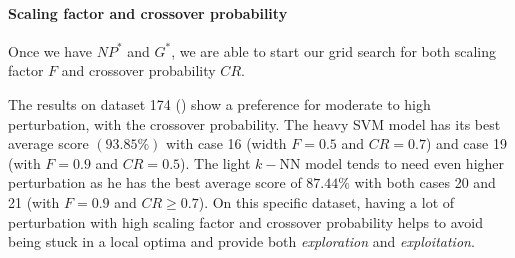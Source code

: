 \documentclass[12pt, openany]{article}
\begin{document}
\paragraph{Scaling factor and crossover probability} Once we have $NP^*$ and $G^*$, we are able to start our grid search for both scaling factor $F$ and crossover probability $CR$.

The results on dataset 174 () show a preference for moderate to high perturbation, with the crossover probability. The heavy SVM model has its best average score $(93.85\%)$ with case 16 (width $F=0.5$ and $CR=0.7$) and case 19 (with $F=0.9$ and $CR=0.5$). The light $k-$NN model tends to need even higher perturbation as he has the best average score of $87.44\%$ with both cases 20 and 21 (with $F=0.9$ and $CR \geq 0.7$). On this specific dataset, having a lot of perturbation with high scaling factor and crossover probability helps to avoid being stuck in a local optima and provide both \emph{exploration} and \emph{exploitation}.
\end{document}
